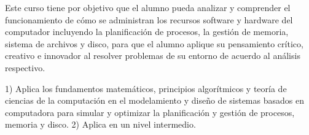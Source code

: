 \documentclass[12pt]{article}
\begin{document}
\begin{objetivosCurso}
    \begin{resultadosEspecificos}
    Este curso tiene por objetivo que el alumno pueda analizar y comprender el funcionamiento de cómo se administran los recursos software y hardware del computador incluyendo la planificación de procesos, la gestión de memoria, sistema de archivos y disco, para que el alumno aplique su pensamiento crítico, creativo e innovador al resolver problemas de su entorno de acuerdo al análisis  respectivo.
    
       
    \end{resultadosEspecificos}
    \begin{resultadosEstudiante}
        1) Aplica los fundamentos matemáticos, principios algorítmicos y teoría de ciencias de la computación en el modelamiento y diseño de sistemas basados en computadora para simular y optimizar la planificación y gestión de procesos, memoria y disco.  2) Aplica en un nivel intermedio.
    \end{resultadosEstudiante}
\end{objetivosCurso}

\begin{ListaTemas}

\end{ListaTemas}
\end{document}
